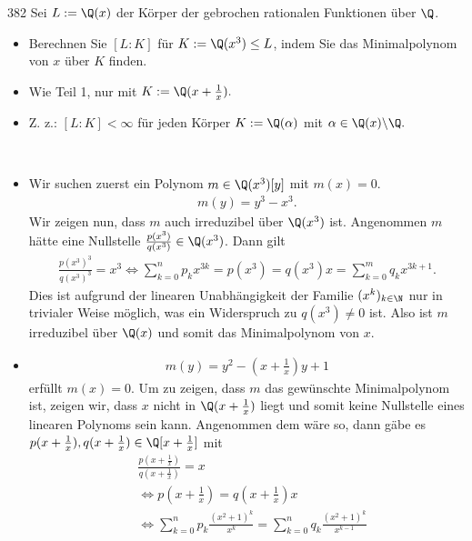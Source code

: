 \begin{algebraUE}{382}
  Sei $L := \Q(x)$ der Körper der gebrochen rationalen Funktionen über $\Q$.
  \begin{itemize}
      \item Berechnen Sie $[L:K]$ für $K:= \Q(x^3) \leq L$, indem Sie das Minimalpolynom von $x$ über $K$ finden.
      \item Wie Teil 1, nur mit $K := \Q(x+\frac{1}{x}).$
      \item Z. z.: $[L:K] < \infty$ für jeden Körper $K := \Q(\alpha)$ mit $\alpha \in \Q(x) \backslash \Q.$
  \end{itemize}
\end{algebraUE}

\begin{solution}
\leavevmode \\
\begin{itemize}
  \item   Wir suchen zuerst ein Polynom $m \in \Q(x^3)[y]$ mit $m(x) = 0$.
    \begin{align*}
        m(y) = y^3 - x^3.
    \end{align*}
    Wir zeigen nun, dass $m$ auch irreduzibel über $\Q(x^3)$ ist. Angenommen $m$
    hätte eine Nullstelle  $\frac{p(x^3)}{q(x^3)} \in \Q(x^3)$. Dann gilt
    \begin{align*}
      \frac{p(x^3)^3}{q(x^3)^3} = x^3
      \iff \sum_{k=0}^np_kx^{3k} = p(x^3) = q(x^3)x = \sum_{k=0}^mq_kx^{3k+1}.
    \end{align*}
    Dies ist aufgrund der linearen Unabhängigkeit der Familie $(x^k)_{k \in \N}$
    nur in trivialer Weise möglich, was ein Widerspruch zu $q(x^3) \neq 0$ ist.
    Also ist $m$ irreduzibel über $\Q(x)$ und somit das Minimalpolynom von $x$.
  \item \begin{align*}
    m(y) = y^2 - (x + \frac{1}{x})y + 1
  \end{align*}
  erfüllt $m(x) = 0$. Um zu zeigen, dass $m$ das gewünschte Minimalpolynom ist,
  zeigen wir, dass $x$ nicht in $\Q(x + \frac{1}{x})$ liegt und somit keine
  Nullstelle eines linearen Polynoms sein kann. Angenommen dem wäre so, dann gäbe
  es $p(x+\frac{1}{x}),q(x+\frac{1}{x}) \in \Q[x+\frac{1}{x}]$ mit
  \begin{align*}
    &\frac{p(x+\frac{1}{x})}{q(x+\frac{1}{x})} = x \\
    &\iff p(x+\frac{1}{x}) = q(x + \frac{1}{x})x \\
    &\iff \sum_{k=0}^np_k\frac{(x^2+1)^k}{x^k} = \sum_{k=0}^nq_k\frac{(x^2+1)^k}{x^{k-1}} \\

\end{align*}
\end{itemize}
\end{solution}
